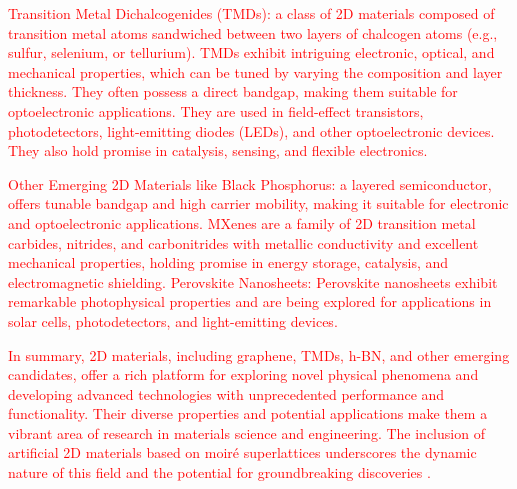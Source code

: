 \textcolor{red}{Transition Metal Dichalcogenides (TMDs): a class of 2D materials composed of transition metal atoms sandwiched between two layers of chalcogen atoms (e.g., sulfur, selenium, or tellurium). TMDs exhibit intriguing electronic, optical, and mechanical properties, which can be tuned by varying the composition and layer thickness. They often possess a direct bandgap, making them suitable for optoelectronic applications. They are used in field-effect transistors, photodetectors, light-emitting diodes (LEDs), and other optoelectronic devices. They also hold promise in catalysis, sensing, and flexible electronics.}

\textcolor{red}{Other Emerging 2D Materials like Black Phosphorus: a layered semiconductor, offers tunable bandgap and high carrier mobility, making it suitable for electronic and optoelectronic applications. MXenes are a family of 2D transition metal carbides, nitrides, and carbonitrides with metallic conductivity and excellent mechanical properties, holding promise in energy storage, catalysis, and electromagnetic shielding. Perovskite Nanosheets: Perovskite nanosheets exhibit remarkable photophysical properties and are being explored for applications in solar cells, photodetectors, and light-emitting devices.}

\textcolor{red}{In summary, 2D materials, including graphene, TMDs, \gls{h-BN}, and other emerging candidates, offer a rich platform for exploring novel physical phenomena and developing advanced technologies with unprecedented performance and functionality. Their diverse properties and potential applications make them a vibrant area of research in materials science and engineering. The inclusion of artificial 2D materials based on moiré superlattices underscores the dynamic nature of this field and the potential for groundbreaking discoveries \cite{kennes2021moire}.}
